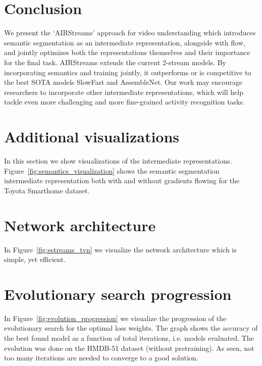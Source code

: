 \documentclass[final]{cvpr}
\begin{document}
\section{Conclusion}
We present the `AIRStreams' approach for video understanding which introduces semantic segmentation as an intermediate representation, alongside with flow, and jointly optimizes both the representations themselves and their importance for the final task. 
AIRStreams extends the current 2-stream models. By incorporating semantics and training jointly, it outperforms or is competitive to the best SOTA models SlowFast and AssembleNet.
Our work may encourage researchers to incorporate 
other intermediate representations, which will help tackle even more challenging and more fine-grained 
activity recognition tasks.









\balance
{\small


}

\newpage
\appendix
\nobalance
\section{Additional visualizations}

In this section we show visualizations of the intermediate representations. Figure~\ref{fig:semantics_visualization} shows the semantic segmentation intermediate representation both with and without gradients flowing for the Toyota Smarthome dataset.


\section{Network architecture}

In Figure~\ref{fig:estreams_tvn} we visualize the network architecture which is simple, yet efficient.

\section{Evolutionary search progression}

In Figure~\ref{fig:evolution_progression} we visualize the progression of the evolutionary search for the optimal loss weights. The graph shows the accuracy of the best found model as a function of total iterations, i.e. models evaluated. The evolution was done on the HMDB-51 dataset (without pretraining). As seen, not too many iterations are needed to converge to a good solution.
\end{document}
